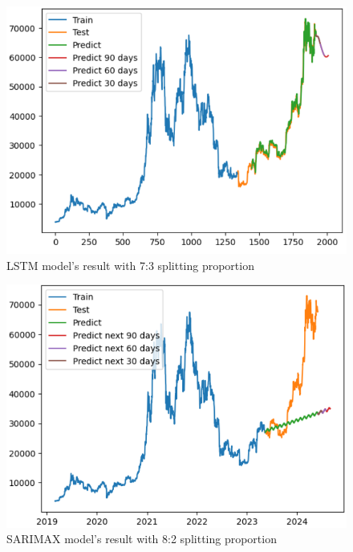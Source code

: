 \documentclass{ieeeojies}
\begin{document}
\begin{figure}[H]
	\centering
	\begin{minipage}{0.6\linewidth}
		\centering
		\includegraphics[width=\linewidth]{bibliography/Images/LSTM_BTC_73.PNG}
		\caption{LSTM model's result with 7:3 splitting proportion}
	\end{minipage}
\end{figure}
\begin{figure}[H]
	\centering
	\begin{minipage}{0.6\linewidth}
		\centering
		\includegraphics[width=\linewidth]{bibliography/Images/SARIMAX_BTC_82.PNG}
		\caption{SARIMAX model's result with 8:2 splitting proportion}
	\end{minipage}
\end{figure}
\end{document}

